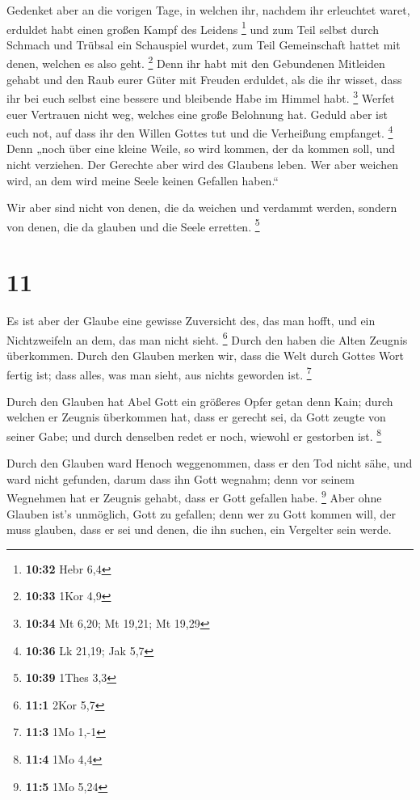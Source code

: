  Gedenket aber an die vorigen Tage, in welchen ihr,
nachdem ihr erleuchtet waret, erduldet habt einen großen Kampf des
Leidens \footnote{\textbf{10:32} Hebr 6,4}  und zum Teil
selbst durch Schmach und Trübsal ein Schauspiel wurdet, zum Teil
Gemeinschaft hattet mit denen, welchen es also geht. \footnote{\textbf{10:33}
  1Kor 4,9}  Denn ihr habt mit den Gebundenen Mitleiden
gehabt und den Raub eurer Güter mit Freuden erduldet, als die ihr
wisset, dass ihr bei euch selbst eine bessere und bleibende Habe im
Himmel habt. \footnote{\textbf{10:34} Mt 6,20; Mt 19,21; Mt 19,29}
 Werfet euer Vertrauen nicht weg, welches eine große
Belohnung hat.  Geduld aber ist euch not, auf dass ihr
den Willen Gottes tut und die Verheißung empfanget. \footnote{\textbf{10:36}
  Lk 21,19; Jak 5,7}  Denn „noch über eine kleine Weile,
so wird kommen, der da kommen soll, und nicht verziehen. 
Der Gerechte aber wird des Glaubens leben. Wer aber weichen wird, an dem
wird meine Seele keinen Gefallen haben.``

 Wir aber sind nicht von denen, die da weichen und
verdammt werden, sondern von denen, die da glauben und die Seele
erretten. \footnote{\textbf{10:39} 1Thes 3,3}

\hypertarget{section-5}{%
\section{11}\label{section-5}}

 Es ist aber der Glaube eine gewisse Zuversicht des, das
man hofft, und ein Nichtzweifeln an dem, das man nicht sieht.
\footnote{\textbf{11:1} 2Kor 5,7}  Durch den haben die
Alten Zeugnis überkommen.  Durch den Glauben merken wir,
dass die Welt durch Gottes Wort fertig ist; dass alles, was man sieht,
aus nichts geworden ist. \footnote{\textbf{11:3} 1Mo 1,-1}

 Durch den Glauben hat Abel Gott ein größeres Opfer getan
denn Kain; durch welchen er Zeugnis überkommen hat, dass er gerecht sei,
da Gott zeugte von seiner Gabe; und durch denselben redet er noch,
wiewohl er gestorben ist. \footnote{\textbf{11:4} 1Mo 4,4}

 Durch den Glauben ward Henoch weggenommen, dass er den
Tod nicht sähe, und ward nicht gefunden, darum dass ihn Gott wegnahm;
denn vor seinem Wegnehmen hat er Zeugnis gehabt, dass er Gott gefallen
habe. \footnote{\textbf{11:5} 1Mo 5,24}  Aber ohne Glauben
ist's unmöglich, Gott zu gefallen; denn wer zu Gott kommen will, der
muss glauben, dass er sei und denen, die ihn suchen, ein Vergelter sein
werde.

